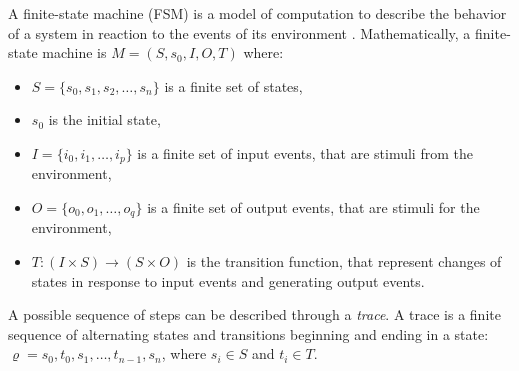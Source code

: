 \begin{definition}
	A finite-state machine (FSM) is a model of computation to describe the behavior of a system in reaction to the events of its environment \cite{BaeStateMachine}. Mathematically, a finite-state machine is $M = (S, s_0, I, O, T)$  where:
	\begin{itemize}
		\item $S = \{s_0, s_1, s_2, \dots , s_n\}$ is a finite set of states,
		\item $s_0$ is the initial state, 
		\item $I = \{i_0, i_1, \dots , i_p\}$ is a finite set of input events, that are stimuli from the environment, 
		\item $O = \{o_0, o_1, \dots , o_q\}$ is a finite set of output events, that are stimuli for the environment,
		\item $T : (I \times S) \to (S \times O) $ is the transition function, that represent changes of states in response to input events and generating output events.
	\end{itemize}
	A possible sequence of steps can be described through a \textit{trace}. A trace is a finite sequence of alternating states and transitions beginning and ending in a state: $\varrho = s_0, t_0, s_1, \dots , t_{n-1}, s_n$, where $s_i \in S$ and $t_i \in T$.
\end{definition}


